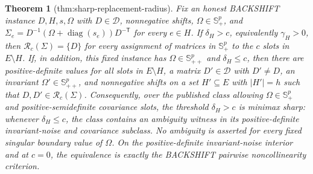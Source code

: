 \documentclass{article}
\newtheorem{theorem}{Theorem}
\begin{document}
\begin{theorem}[thm:sharp-replacement-radius]\label{thm:sharp-replacement-radius}
Fix an honest BACKSHIFT instance \(D,H,s,\Omega\) with \(D\in\mathcal D\), nonnegative shifts, \(\Omega\in\mathbb S_{+}^{p}\), and \(\Sigma_e=D^{-1}(\Omega+\operatorname{diag}(s_e))D^{-\mathsf T}\) for every \(e\in H\). If \(\delta_H>c\), equivalently \(\gamma_H>0\), then \(\mathcal R_c(\Sigma)=\{D\}\) for every assignment of matrices in \(\mathbb S_{+}^{p}\) to the \(c\) slots in \(E\setminus H\). If, in addition, this fixed instance has \(\Omega\in\mathbb S_{++}^{p}\) and \(\delta_H\le c\), then there are positive-definite values for all slots in \(E\setminus H\), a matrix \(D'\in\mathcal D\) with \(D'\ne D\), an invariant \(\Omega'\in\mathbb S_{++}^{p}\), and nonnegative shifts on a set \(H'\subseteq E\) with \(|H'|=h\) such that \(D,D'\in\mathcal R_c(\Sigma)\). Consequently, over the published class allowing \(\Omega\in\mathbb S_{+}^{p}\) and positive-semidefinite covariance slots, the threshold \(\delta_H>c\) is minimax sharp: whenever \(\delta_H\le c\), the class contains an ambiguity witness in its positive-definite invariant-noise and covariance subclass. No ambiguity is asserted for every fixed singular boundary value of \(\Omega\). On the positive-definite invariant-noise interior and at \(c=0\), the equivalence is exactly the BACKSHIFT pairwise noncollinearity criterion.
\end{theorem}
\end{document}
